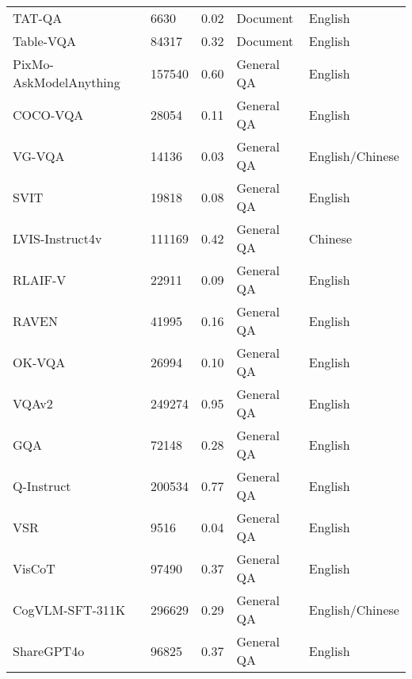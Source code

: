 \begin{table}[h]
\begin{tabular}{l|l|l|l|l}
TAT-QA~\cite{zhu-etal-2021-tat}                          & 6630    & 0.02     & Document     & English         \\
Table-VQA~\cite{kim2024tablevqabench}                       & 84317   & 0.32     & Document     & English         \\
PixMo-AskModelAnything~\cite{deitke2024molmo}          & 157540  & 0.60      & General QA   & English         \\
COCO-VQA~\cite{ren2015exploring}                        & 28054   & 0.11     & General QA   & English         \\
VG-VQA~\cite{reich2024uncoveringpotentialvisualgrounding}                          & 14136   & 0.03     & General QA   & English/Chinese \\
SVIT~\cite{zhao2023svit}                            & 19818   & 0.08     & General QA   & English         \\
LVIS-Instruct4v~\cite{wang2023instruct4v}                 & 111169  & 0.42     & General QA   & Chinese         \\
RLAIF-V~\cite{yu2024rlaifv}                          & 22911   & 0.09     & General QA   & English         \\
RAVEN~\cite{zhang2019raven}                           & 41995   & 0.16     &  General QA    & English         \\
OK-VQA~\cite{marino2019ok}                          & 26994    & 0.10     & General QA   & English         \\
VQAv2~\cite{goyal2017making}                           & 249274  & 0.95     & General QA   & English         \\
GQA~\cite{hudson2019gqa}                             & 72148   & 0.28     & General QA   & English         \\
Q-Instruct~\cite{wu2023qinstruct}                      & 200534  & 0.77     & General QA   & English         \\
VSR~\cite{Liu2022VisualSR}                             & 9516    & 0.04     & General QA   & English         \\
VisCoT~\cite{shao2024visual}                          & 97490   & 0.37     & General QA   & English         \\
CogVLM-SFT-311K~\cite{wang2023cogvlm}                 & 296629  & 0.29     & General QA   & English/Chinese \\
ShareGPT4o~\cite{internvl_2024}                      & 96825   & 0.37     & General QA   & English         \\

\end{tabular}
\end{table}
